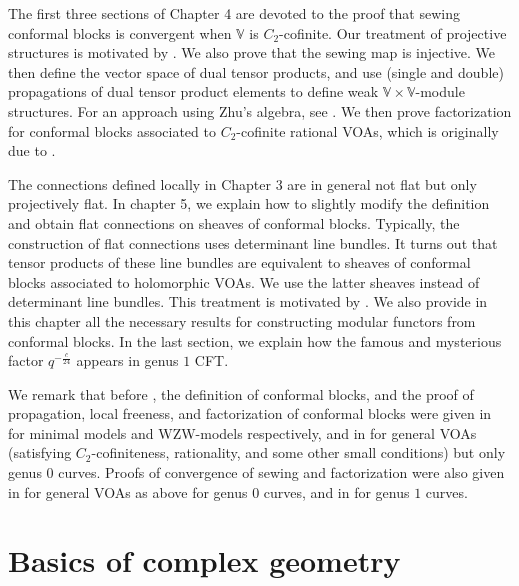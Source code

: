 \documentclass[12pt,b5paper,notitlepage]{report}
\theoremstyle{definition}
\theoremstyle{plain}
\newcommand{\Vbb}{\mathbb V}
\numberwithin{equation}{section}
\begin{document}
The first three sections of Chapter 4 are devoted to the proof that sewing conformal blocks is convergent when $\Vbb$ is $C_2$-cofinite. Our treatment of projective structures is motivated by \cite[Sec. 8.2]{FB04}. We also prove that the sewing map is injective. We then define the vector space of dual tensor products, and use (single and double) propagations of dual tensor product elements to define weak $\Vbb\times\Vbb$-module structures.  For an approach using Zhu's algebra, see \cite{DGT19b}. We then prove factorization for conformal blocks associated to $C_2$-cofinite rational VOAs, which is originally due to \cite{DGT19b}.

The connections defined locally in Chapter 3 are in general not flat but only projectively flat. In chapter 5, we explain how to slightly modify the definition and obtain flat connections on sheaves of conformal blocks. Typically, the construction of flat connections uses determinant line bundles. It turns out that tensor products of these line bundles are equivalent to sheaves of conformal blocks associated to holomorphic VOAs. We use the latter sheaves instead of determinant line bundles. This treatment is motivated by \cite{AU07a,AU07b}. We also provide in this chapter all the necessary results for constructing modular functors from conformal blocks. In the last section, we explain how the famous and mysterious factor $q^{-\frac c{24}}$ appears in genus $1$ CFT.

We remark that before \cite{FB04,DGT19a,DGT19b}, the definition of conformal blocks, and the proof of propagation, local freeness, and factorization of conformal blocks were given in \cite{BFM91,TUY89} for minimal models and WZW-models respectively, and in \cite{NT05} for general VOAs (satisfying $C_2$-cofiniteness, rationality, and some other small conditions) but only genus $0$ curves. Proofs of convergence of sewing and factorization were also given in \cite{Hua95,Hua98,Hua05a} for general VOAs as above for genus $0$ curves, and in \cite{Zhu96,Hua05b} for genus $1$ curves.








\chapter{Basics of complex geometry}
\end{document}
